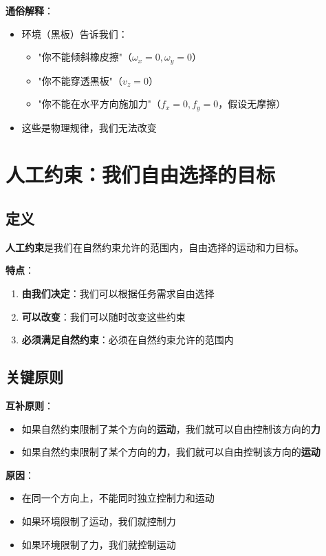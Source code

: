 \documentclass[12pt,a4paper]{article}
\begin{document}
\textbf{通俗解释}：
\begin{itemize}
\item 环境（黑板）告诉我们：
\begin{itemize}
\item "你不能倾斜橡皮擦"（$\omega_x = 0, \omega_y = 0$）
\item "你不能穿透黑板"（$v_z = 0$）
\item "你不能在水平方向施加力"（$f_x = 0, f_y = 0$，假设无摩擦）
\end{itemize}
\item 这些是物理规律，我们无法改变
\end{itemize}

\section{人工约束：我们自由选择的目标}

\subsection{定义}

\textbf{人工约束}是我们在自然约束允许的范围内，自由选择的运动和力目标。

\textbf{特点}：
\begin{enumerate}
\item \textbf{由我们决定}：我们可以根据任务需求自由选择
\item \textbf{可以改变}：我们可以随时改变这些约束
\item \textbf{必须满足自然约束}：必须在自然约束允许的范围内
\end{enumerate}

\subsection{关键原则}

\textbf{互补原则}：
\begin{itemize}
\item 如果自然约束限制了某个方向的\textbf{运动}，我们就可以自由控制该方向的\textbf{力}
\item 如果自然约束限制了某个方向的\textbf{力}，我们就可以自由控制该方向的\textbf{运动}
\end{itemize}

\textbf{原因}：
\begin{itemize}
\item 在同一个方向上，不能同时独立控制力和运动
\item 如果环境限制了运动，我们就控制力
\item 如果环境限制了力，我们就控制运动
\end{itemize}
\end{document}
